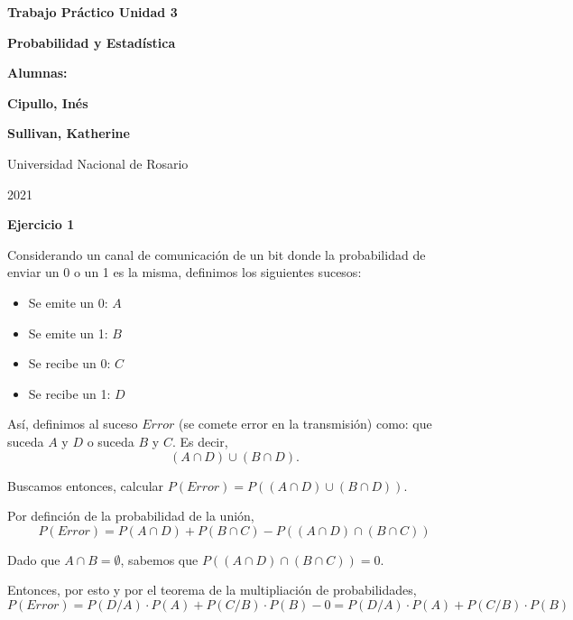 \documentclass[11pt]{article}
\begin{document}
\begin{titlepage}
    \begin{center}
        \vfill
        \vfill
            \vspace{0.7cm}
            \noindent\textbf{\Huge Trabajo Pr\'actico Unidad 3}\par
            \noindent\textbf{\Huge Probabilidad y Estad\'istica}\par
            \vspace{.5cm}
        \vfill
        \noindent \textbf{\huge Alumnas:}\par
        \vspace{.5cm}
        \noindent \textbf{\Large Cipullo, In\'es}\par
        \noindent \textbf{\Large Sullivan, Katherine}\par
 
        \vfill
        \large Universidad Nacional de Rosario \par
        \noindent\large 2021
    \end{center}
\end{titlepage}
\par


\textbf{Ejercicio 1}

Considerando un canal de comunicaci\'on de un bit donde la probabilidad de enviar un 0 o un 1 es la misma, definimos los siguientes sucesos: 
\begin{itemize}
    \item Se emite un 0: $A$
    \item Se emite un 1: $B$
    \item Se recibe un 0: $C$
    \item Se recibe un 1: $D$
\end{itemize}

As\'i, definimos al suceso $Error$ (se comete error en la transmisión) como: que suceda $A$ y $D$ o suceda $B$ y $C$. Es decir, $$(A \cap D) \cup (B \cap D).$$

Buscamos entonces, calcular $P(Error) = P((A \cap D) \cup (B \cap D))$.

Por definci\'on de la probabilidad de la uni\'on, 
\[ P(Error) = P(A \cap D) + P(B \cap C) - P((A \cap D) \cap (B \cap C)) \]

Dado que $A \cap B = \emptyset$, sabemos que $P((A \cap D) \cap (B \cap C)) = 0$.

Entonces, por esto y por el teorema de la multipliaci\'on de probabilidades,
\[ P(Error) =  P(D/A) \cdot P(A) + P(C/B) \cdot P(B) - 0 = P(D/A) \cdot P(A) + P(C/B) \cdot P(B) \]
\end{document}
